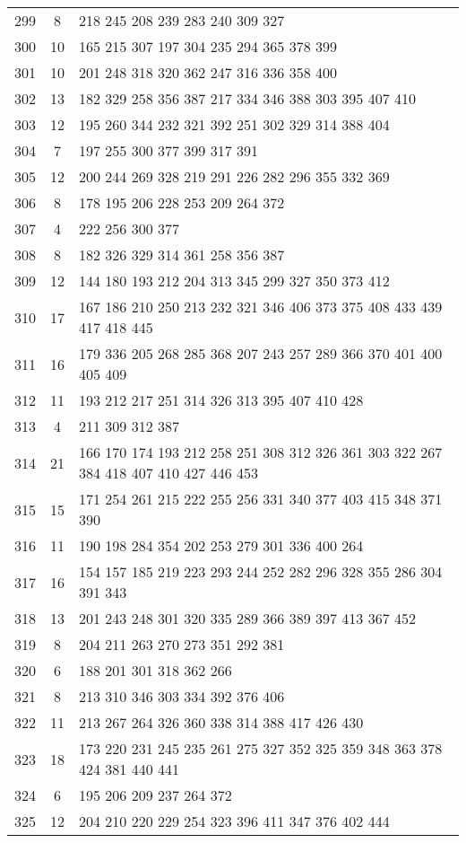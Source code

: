 \documentclass{standalone}
\begin{document}
\begin{tabular}{c c l}
299 & 8 & 218 245 208 239 283 240 309 327 \\
300 & 10 & 165 215 307 197 304 235 294 365 378 399 \\
301 & 10 & 201 248 318 320 362 247 316 336 358 400 \\
302 & 13 & 182 329 258 356 387 217 334 346 388 303 395 407 410 \\
303 & 12 & 195 260 344 232 321 392 251 302 329 314 388 404 \\
304 & 7 & 197 255 300 377 399 317 391 \\
305 & 12 & 200 244 269 328 219 291 226 282 296 355 332 369 \\
306 & 8 & 178 195 206 228 253 209 264 372 \\
307 & 4 & 222 256 300 377 \\
308 & 8 & 182 326 329 314 361 258 356 387 \\
309 & 12 & 144 180 193 212 204 313 345 299 327 350 373 412 \\
310 & 17 & 167 186 210 250 213 232 321 346 406 373 375 408 433 439 417 418 445 \\
311 & 16 & 179 336 205 268 285 368 207 243 257 289 366 370 401 400 405 409 \\
312 & 11 & 193 212 217 251 314 326 313 395 407 410 428 \\
313 & 4 & 211 309 312 387 \\
314 & 21 & 166 170 174 193 212 258 251 308 312 326 361 303 322 267 384 418 407 410 427 446 453 \\
315 & 15 & 171 254 261 215 222 255 256 331 340 377 403 415 348 371 390 \\
316 & 11 & 190 198 284 354 202 253 279 301 336 400 264 \\
317 & 16 & 154 157 185 219 223 293 244 252 282 296 328 355 286 304 391 343 \\
318 & 13 & 201 243 248 301 320 335 289 366 389 397 413 367 452 \\
319 & 8 & 204 211 263 270 273 351 292 381 \\
320 & 6 & 188 201 301 318 362 266 \\
321 & 8 & 213 310 346 303 334 392 376 406 \\
322 & 11 & 213 267 264 326 360 338 314 388 417 426 430 \\
323 & 18 & 173 220 231 245 235 261 275 327 352 325 359 348 363 378 424 381 440 441 \\
324 & 6 & 195 206 209 237 264 372 \\
325 & 12 & 204 210 220 229 254 323 396 411 347 376 402 444 \\

\end{tabular}
\end{document}

